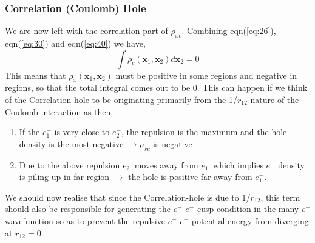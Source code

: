 \documentclass{article}
\begin{document}
\begin{Large}
\begin{flushleft}
  \subsubsection*{\Large{Correlation (Coulomb) Hole}}
  We are now left with the correlation part of $\rho_{xc}$. Combining eqn(\ref{eq:26}), eqn(\ref{eq:30}) and eqn(\ref{eq:40}) we have,
  \begin{equation}\label{eq:42}
  \displaystyle{\int}\rho_c(\textbf{x}_1,\textbf{x}_2)d\textbf{x}_2 = 0
  \end{equation}
  This means that $\rho_x(\textbf{x}_1,\textbf{x}_2)$ must be positive in some regions and negative in regions, so that the total integral comes out to be 0. This can happen if we think of the Correlation hole to be originating primarily from the 1/$r_{12}$ nature of the Coulomb interaction as then, 
  \begin{enumerate}
  \item{If the $e^-_1$ is very close to $e^-_2$, the repulsion is the maximum and the hole density is the most negative $\rightarrow \rho_{xc}$ is negative}
  \item{Due to the above repulsion $e^-_2$ moves away from $e^-_1$ which implies $e^-$ density is piling up in far region $\rightarrow$ the hole is positive far away from $e^-_1$.}
  \end{enumerate}
  We should now realise that since the Correlation-hole is due to 1/$r_{12}$, this term should also be responsible for generating the $e^-$-$e^-$ cusp condition in the many-$e^-$ wavefunction so as to prevent the repulsive $e^-$-$e^-$ potential energy from diverging at $r_{12}=0$. 
  

\end{flushleft}
\end{Large}
\end{document}

